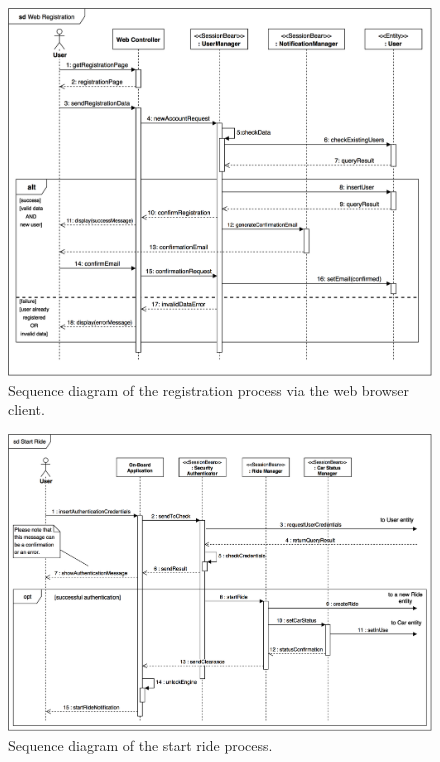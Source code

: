 \begin{figure}[H]
\begin{center}
		\includegraphics[width=\textwidth]{./arch_design/diagrams/registration_sd.png}
		\caption{Sequence diagram of the registration process via the web browser client.}
		\label{registration_sd}
\end{center}
\end{figure}

\begin{figure}[H]
\begin{center}
		\includegraphics[width=\textwidth]{./arch_design/diagrams/start_ride_sd.png}
		\caption{Sequence diagram of the start ride process.}
		\label{start_ride_sd}
\end{center}
\end{figure}